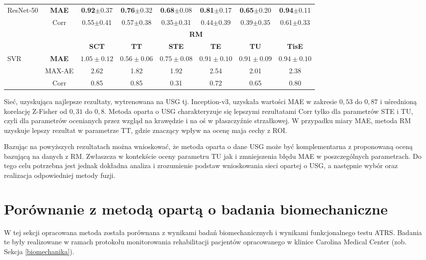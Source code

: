 \begin{table}[h]
\begin{tabular}{lc||c|c|c|c|c|c}
		ResNet-50 & \textbf{MAE} & \textbf{0.92}$\pm$0.37 & \textbf{0.76}$\pm$0.32 & \textbf{0.68}$\pm$0.08 & \textbf{0.81}$\pm$0.17 & \textbf{0.65}$\pm$0.20 & \textbf{0.94}$\pm$0.11 \\
		& Corr & 0.55$\pm$0.41 & 0.57$\pm$0.38 & 0.35$\pm$0.31 & 0.44$\pm$0.39 & 0.39$\pm$0.35 & 0.61$\pm$0.33 \\ \hline \hline
				& & \multicolumn{6}{c}{\normalsize{\textbf{RM}}} \\
		& & \textbf{SCT} & \textbf{TT} & \textbf{STE} & \textbf{TE} & \textbf{TU} & \textbf{TisE}\\ \hline
		SVR & \textbf{MAE} & $1.05\pm0.12$ & $0.56\pm0.06$ & $0.75\pm0.08$ & $0.91\pm0.10$ & $0.91\pm0.09$ & $0.94\pm0.10$\\
		& MAX-AE & 2.62 & 1.82 & 1.92 & 2.54 & 2.01 & 2.38 \\
		& Corr   & 0.85 & 0.85 & 0.31 & 0.72 & 0.65 & 0.80 \\
		\hline \hline
	\end{tabular}
\end{table}

Sieć, uzyskująca najlepsze rezultaty, wytrenowana na USG tj. Inception-v3, uzyskała wartości MAE w zakresie $0,53$ do $0,87$ i uśrednioną korelację Z-Fisher od $0,31$ do $0,8$.
Metoda oparta o USG charakteryzuje się lepszymi rezultatami Corr tylko dla parametrów STE i TU, czyli dla parametrów ocenianych przez wzgląd na krawędzie i na oś w płaszczyźnie strzałkowej. W przypadku miary MAE, metoda RM uzyskuje lepszy rezultat w parametrze TT, gdzie znaczący wpływ na ocenę maja cechy z ROI.

Bazując na powyższych rezultatach można wnioskować, że metoda oparta o dane USG może być komplementarna z proponowaną oceną bazującą na danych z RM. Zwłaszcza w kontekście oceny parametru TU jak i zmniejszenia błędu MAE w poszczególnych parametrach. Do tego celu potrzebna jest jednak dokładna analiza i zrozumienie podstaw wnioskowania sieci opartej o USG, a następnie wybór oraz realizacja odpowiedniej metody fuzji.

\section{Porównanie z metodą opartą o badania biomechaniczne}
\label{seq:comp-biomechanics}
W tej sekcji opracowana metoda została porównana z wynikami badań biomechanicznych i wynikami funkcjonalnego testu ATRS. Badania te były realizowane w ramach protokołu monitorowania rehabilitacji pacjentów opracowanego w klinice Carolina Medical Center (zob. Sekcja \ref{biomechanika}). 


